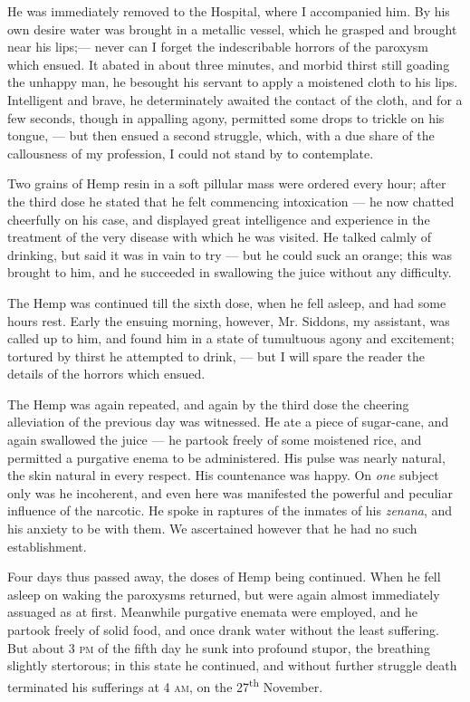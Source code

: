 \documentclass[a4paper, 11pt, oneside, polutonikogreek, english]{article}
\begin{document}
He was immediately removed to the Hospital, where I accompanied him. By his own desire water was brought in a metallic vessel, which he grasped and brought near his lips;--- never can I forget the indescribable horrors of the paroxysm which ensued. It abated in about three minutes, and morbid thirst still goading the unhappy man, he besought his servant to apply a moistened cloth to his lips. Intelligent and brave, he determinately awaited the contact of the cloth, and for a few seconds, though in appalling agony, permitted some drops to trickle on his tongue, --- but then ensued a second struggle, which, with a due share of the callousness of my profession, I could not stand by to contemplate.

Two grains of Hemp resin in a soft pillular mass were ordered every hour; after the third dose he stated that he felt commencing intoxication --- he now chatted cheerfully on his case, and displayed great intelligence and experience in the treatment of the very disease with which he was visited. He talked calmly of drinking, but said it was in vain to try --- but he could suck an orange; this was brought to him, and he succeeded in swallowing the juice without any difficulty.

The Hemp was continued till the sixth dose, when he fell asleep, and had some hours rest. Early the ensuing morning, however, Mr. Siddons, my assistant, was called up to him, and found him in a state of tumultuous agony and excitement; tortured by thirst he attempted to drink, --- but I will spare the reader the details of the horrors which ensued.

The Hemp was again repeated, and again by the third dose the cheering alleviation of the previous day was witnessed. He ate a piece of sugar-cane, and again swallowed the juice --- he partook freely of some moistened rice, and permitted a purgative enema to be administered. His pulse was nearly natural, the skin natural in every respect. His countenance was happy. On \emph{one} subject only was he incoherent, and even here was manifested the powerful and peculiar influence of the narcotic. He spoke in raptures of the inmates of his \emph{zenana}, and his anxiety to be with them. We ascertained however that he had no such establishment.

Four days thus passed away, the doses of Hemp being continued. When he fell asleep on waking the paroxysms returned, but were again almost immediately assuaged as at first. Meanwhile purgative enemata were employed, and he partook freely of solid food, and once drank water without the least suffering. But about 3 \textsc{pm} of the fifth day he sunk into profound stupor, the breathing slightly stertorous; in this state he continued, and without further struggle death terminated his sufferings at 4 \textsc{am}, on the 27\textsuperscript{th} November.
\end{document}
